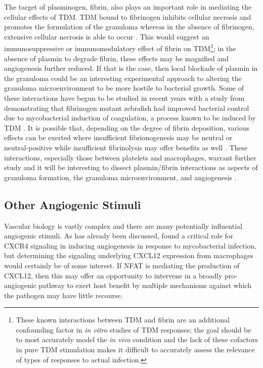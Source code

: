 The target of plasminogen, fibrin, also plays an important role in mediating the cellular effects of TDM. TDM bound to fibrinogen inhibits cellular necrosis and promotes the formulation of the granuloma whereas in the absence of fibrinogen, extensive cellular necrosis is able to occur \citep{Sakamoto2010}. This would suggest an immunosuppressive or immunomodulatory effect of fibrin on TDM\footnote{These known interactions between TDM and fibrin are an additional confounding factor in \textit{in vitro} studies of TDM responses; the goal should be to most accurately model the \textit{in vivo} condition and the lack of these cofactors in pure TDM stimulation makes it difficult to accurately assess the relevance of types of responses to actual infection.}; in the absence of plasmin to degrade fibrin, these effects may be magnified and angiogenesis further reduced. If that is the case, then local blockade of plasmin in the granuloma could be an interesting experimental approach to altering the granuloma microenvironment to be more hostile to bacterial growth. Some of these interactions have begun to be studied in recent years with a study from \citet{Hortle2019} demonstrating that fibrinogen mutant zebrafish had improved bacterial control due to mycobacterial induction of coagulation, a process known to be induced by TDM \citep{Retzinger1982, Retzinger1987, Donnachie2016}. It is possible that, depending on the degree of fibrin deposition, various effects can be exerted where insufficient fibrionogenesis may be neutral or neutral\hyp{}positive while insufficient fibrinolysis may offer benefits as well \citep{Venkatasubramanian2016}. These interactions, especially those between platelets and macrophages, warrant further study and it will be interesting to dissect plasmin/fibrin interactions as aspects of granuloma formation, the granuloma microenvironment, and angiogenesis \citep{Feng2014, LugoVillarino2014}.

\subsection{Other Angiogenic Stimuli}\label{otherang}

Vascular biology is vastly complex and there are many potentially influential angiogenic stimuli. As has already been discussed, \citet{Torraca2017} found a critical role for CXCR4 signaling in inducing angiogenesis in response to mycobacterial infection, but determining the signaling underlying CXCL12 expression from macrophages would certainly be of some interest. If NFAT is mediating the production of CXCL12, then this may offer an opportunity to intervene in a broadly pro\hyp{}angiogenic pathway to exert host benefit by multiple mechanisms against which the pathogen may have little recourse. 


